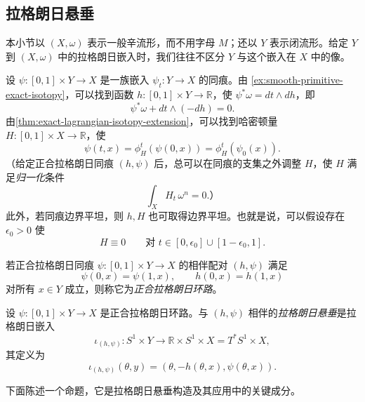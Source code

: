 \subsection{拉格朗日悬垂}
\label{subsec:lagrangian-suspension}

本小节以 $(X,\omega)$ 表示一般辛流形，而不用字母 $M$；还以 $Y$ 表示闭流形。给定 $Y$ 到 $(X,\omega)$ 中的拉格朗日嵌入时，我们往往不区分 $Y$ 与这个嵌入在 $X$ 中的像。

设 $\psi:[0,1]\times Y\to X$ 是一族嵌入 $\psi_t:Y\to X$ 的同痕。由
\cref{ex:smooth-primitive-exact-isotopy}，可以找到函数
$h:[0,1]\times Y\to\mathbb R$，使
$\psi^*\omega=dt\wedge dh$，即
\[
 \psi^*\omega+dt\wedge(-dh)=0.
\]
由\cref{thm:exact-lagrangian-isotopy-extension}，可以找到哈密顿量
$H:[0,1]\times X\to\mathbb R$，使
\begin{equation}
 \psi(t,x)=\phi_H^t(\psi(0,x))=\phi_H^t(\psi_0(x)).
 \label{eq:suspension-hamiltonian-isotopy}
\end{equation}
（给定正合拉格朗日同痕 $(h,\psi)$ 后，总可以在同痕的支集之外调整 $H$，使 $H$ 满足\emph{归一化}条件
\[
 \int_XH_t\,\omega^n=0.\text{）}
\]
此外，若同痕边界平坦，则 $h,H$ 也可取得边界平坦。也就是说，可以假设存在 $\epsilon_0>0$ 使
\begin{equation}
 H\equiv0\qquad\text{对 }t\in[0,\epsilon_0]\cup[1-\epsilon_0,1].
 \label{eq:boundary-flat-hamiltonian}
\end{equation}

若正合拉格朗日同痕 $\psi:[0,1]\times Y\to X$ 的相伴配对 $(h,\psi)$ 满足
\[
 \psi(0,x)=\psi(1,x),\qquad h(0,x)=h(1,x)
\]
对所有 $x\in Y$ 成立，则称它为\emph{正合拉格朗日环路}。

\begin{definition}\label{def:lagrangian-suspension}
设 $\psi:[0,1]\times Y\to X$ 是正合拉格朗日环路。与 $(h,\psi)$ 相伴的\emph{拉格朗日悬垂}是拉格朗日嵌入
\[
 \iota_{(h,\psi)}:S^1\times Y\longrightarrow
 \mathbb R\times S^1\times X=T^*S^1\times X,
\]
其定义为
\begin{equation}
 \iota_{(h,\psi)}(\theta,y)
 =(\theta,-h(\theta,x),\psi(\theta,x)).
 \label{eq:lagrangian-suspension}
\end{equation}
\end{definition}

下面陈述一个命题，它是拉格朗日悬垂构造及其应用中的关键成分。

